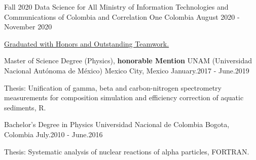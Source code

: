 

\begin{cventries}
  \cventry
    {Fall 2020 Data Science for All} %
    {Ministry of Information Technologies and Communications of Colombia and Correlation One } %
    {Colombia} %
    {August 2020 - November 2020} %
    {\begin{cvitems} %
        \item {\href{https://www.credential.net/e1c5045f-a3b2-4100-9c50-4245b9ae29e1}{Graduated with Honors and Outstanding Teamwork. }}
      \end{cvitems}}
  \cventry
    {Master of Science Degree (Physics), \textbf{honorable Mention}} %
    {UNAM (Universidad Nacional Autónoma de México)} %
    {Mexico City,  Mexico} %
    {January.2017 - June.2019} %
    {
      \begin{cvitems} %
        \item {Thesis: Unification of gamma, beta and carbon-nitrogen spectrometry measurements for composition simulation and efficiency correction of aquatic sediments, R. }
      \end{cvitems}
    }
  \cventry
    {Bachelor's Degree in Physics} %
    {Universidad Nacional de Colombia} %
    {Bogota,  Colombia} %
    {July.2010 - June.2016} %
    {
      \begin{cvitems} %
        \item {Thesis: Systematic analysis of nuclear reactions of alpha particles, FORTRAN.}
      \end{cvitems}
    }
\end{cventries}
